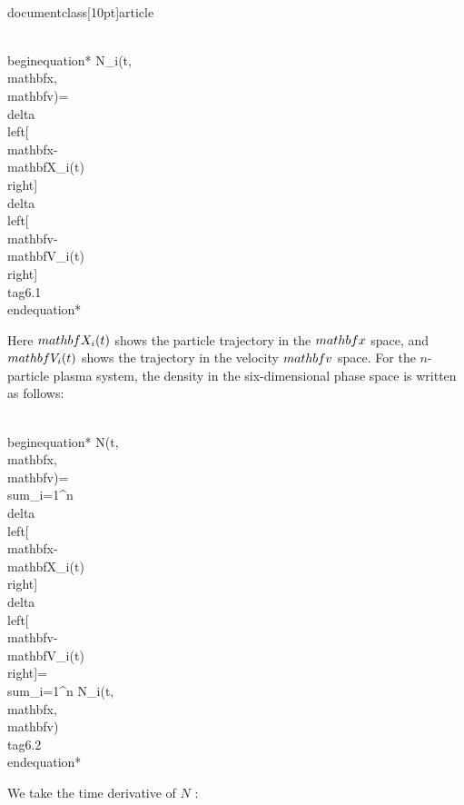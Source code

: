 \\documentclass[10pt]{article}
\begin{document}
{{{{\\begin{equation*}
N_{i}(t, \\mathbf{x}, \\mathbf{v})=\\delta\\left[\\mathbf{x}-\\mathbf{X}_{i}(t)\\right] \\delta\\left[\\mathbf{v}-\\mathbf{V}_{i}(t)\\right] \\tag{6.1}
\\end{equation*}


Here $\\mathbf{X}_{i}(t)$ shows the particle trajectory in the $\\mathbf{x}$ space, and $\\mathbf{V}_{i}(t)$ shows the trajectory in the velocity $\\mathbf{v}$ space. For the $n$-particle plasma system, the density in the six-dimensional phase space is written as follows:


\\begin{equation*}
N(t, \\mathbf{x}, \\mathbf{v})=\\sum_{i=1}^{n} \\delta\\left[\\mathbf{x}-\\mathbf{X}_{i}(t)\\right] \\delta\\left[\\mathbf{v}-\\mathbf{V}_{i}(t)\\right]=\\sum_{i=1}^{n} N_{i}(t, \\mathbf{x}, \\mathbf{v}) \\tag{6.2}
\\end{equation*}


We take the time derivative of $N$ :


}}}}
\end{document}
